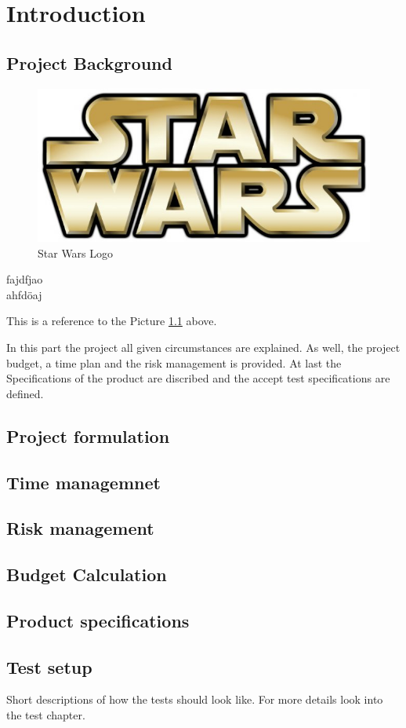 \chapter{Introduction}
\label{sec:intro}


\section{Project Background}
\label{sec:prba}
\begin{figure}[htb]
  \centering  
  \includegraphics[scale=0.5]{img/starwars.jpg}
  \caption{Star Wars Logo}
  \label{fig:starwars}
\end{figure}

fajdfjao\\ 
ahfdöaj \newline %

This is a reference to the Picture \ref{fig:starwars} above.

In this part the project all given circumstances are explained. As well, the project budget, a time plan and the risk management is provided. At last the Specifications of the product are discribed and the accept test specifications are defined. \\


\section{Project formulation}
\label{subsec:prfo}

\section{Time managemnet}
\label{subsec:tima}

\section{Risk management}
\label{subsec:rima}

\section{Budget Calculation}
\label{subsec:buca}

\section{Product specifications}
\label{subsec:prsp}

\section{Test setup}
\label{subsec:tese}

Short descriptions of how the tests should look like. For more details look into the test chapter.